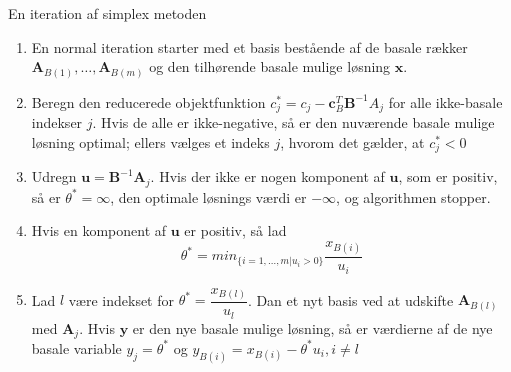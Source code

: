 En iteration af simplex metoden
\begin{enumerate}
\item En normal iteration starter med et basis bestående af de basale rækker $\textbf{A}_{B(1)},\ldots,\textbf{A}_{B(m)}$ og den tilhørende basale mulige løsning $\textbf{x}$.
\item Beregn den reducerede objektfunktion $c_j^* = c_j - \mathbf{c}_B^T \textbf{B}^{-1}A_j$ for alle ikke-basale indekser $j$. Hvis de alle er ikke-negative, så er den nuværende basale mulige løsning optimal; ellers vælges et indeks $j$, hvorom det gælder, at $c^*_j<0$
\item Udregn $\textbf{u}=\textbf{B}^{-1}\textbf{A}_j$. Hvis der ikke er nogen komponent af $\textbf{u}$, som er positiv, så er $\theta ^*=\infty$, den optimale løsnings værdi er $-\infty$, og algorithmen stopper.
\item Hvis en komponent af $\textbf{u}$ er positiv, så lad 
$$\theta^*= min_{ \{i=1,\ldots,m|u_i>0 \} }        \dfrac{x_{B(i)}}{u_i}$$
\item Lad $l$ være indekset for $\theta^*=  \dfrac{x_{B(l)}}{u_l}$. Dan et nyt basis ved at udskifte $\textbf{A}_{B(l)}$ med $\textbf{A}_j$. Hvis $\textbf{y}$ er den nye basale mulige løsning, så er værdierne af de nye basale variable $y_j=\theta^*$ og $y_{B(i)}=x_{B(i)}-\theta^*u_i,i\neq l$
\end{enumerate}


